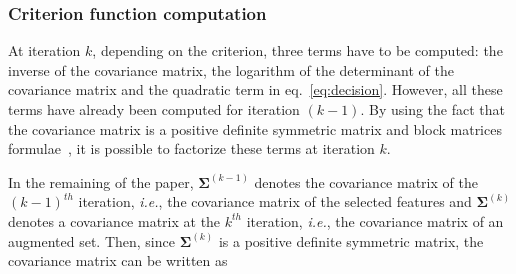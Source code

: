 \documentclass[journal]{IEEEtran}
\begin{document}
        \subsubsection{Criterion function computation}
        \label{sec:update-crit}
        At iteration $k$, depending on the criterion, three terms have
        to  be computed:  the inverse  of the  covariance matrix,  the
        logarithm of the determinant of  the covariance matrix and the
        quadratic  term in  eq.~\ref{eq:decision}. However,  all these
        terms  have already  been computed  for iteration  $(k-1)$. By
        using  the  fact that  the  covariance  matrix is  a  positive
        definite     symmetric    matrix     and    block     matrices
        formulae~\cite[Chapter   9.2]{webb2003statistical},    it   is
        possible to factorize these terms at iteration $k$.

        In the  remaining of the  paper, $\boldsymbol{\Sigma}^{(k-1)}$
        denotes the  covariance matrix of the  $(k-1)^{th}$ iteration,
        \emph{i.e.}, the  covariance matrix  of the  selected features
        and $\boldsymbol{\Sigma}^{(k)}$ denotes a covariance matrix at
        the $k^{th}$ iteration, \emph{i.e.},  the covariance matrix of
        an augmented set. Then, since $\boldsymbol{\Sigma}^{(k)}$ is a
        positive definite symmetric matrix,  the covariance matrix can
        be written as

\end{document}
